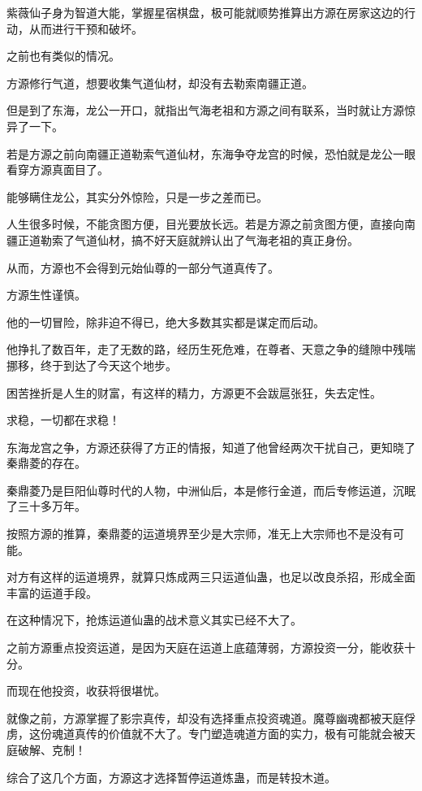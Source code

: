 
\begin{this_body}

紫薇仙子身为智道大能，掌握星宿棋盘，极可能就顺势推算出方源在房家这边的行动，从而进行干预和破坏。

之前也有类似的情况。

方源修行气道，想要收集气道仙材，却没有去勒索南疆正道。

但是到了东海，龙公一开口，就指出气海老祖和方源之间有联系，当时就让方源惊异了一下。

若是方源之前向南疆正道勒索气道仙材，东海争夺龙宫的时候，恐怕就是龙公一眼看穿方源真面目了。

能够瞒住龙公，其实分外惊险，只是一步之差而已。

人生很多时候，不能贪图方便，目光要放长远。若是方源之前贪图方便，直接向南疆正道勒索了气道仙材，搞不好天庭就辨认出了气海老祖的真正身份。

从而，方源也不会得到元始仙尊的一部分气道真传了。

方源生性谨慎。

他的一切冒险，除非迫不得已，绝大多数其实都是谋定而后动。

他挣扎了数百年，走了无数的路，经历生死危难，在尊者、天意之争的缝隙中残喘挪移，终于到达了今天这个地步。

困苦挫折是人生的财富，有这样的精力，方源更不会跋扈张狂，失去定性。

求稳，一切都在求稳！

东海龙宫之争，方源还获得了方正的情报，知道了他曾经两次干扰自己，更知晓了秦鼎菱的存在。

秦鼎菱乃是巨阳仙尊时代的人物，中洲仙后，本是修行金道，而后专修运道，沉眠了三十多万年。

按照方源的推算，秦鼎菱的运道境界至少是大宗师，准无上大宗师也不是没有可能。

对方有这样的运道境界，就算只炼成两三只运道仙蛊，也足以改良杀招，形成全面丰富的运道手段。

在这种情况下，抢炼运道仙蛊的战术意义其实已经不大了。

之前方源重点投资运道，是因为天庭在运道上底蕴薄弱，方源投资一分，能收获十分。

而现在他投资，收获将很堪忧。

就像之前，方源掌握了影宗真传，却没有选择重点投资魂道。魔尊幽魂都被天庭俘虏，这份魂道真传的价值就不大了。专门塑造魂道方面的实力，极有可能就会被天庭破解、克制！

综合了这几个方面，方源这才选择暂停运道炼蛊，而是转投木道。


\end{this_body}
